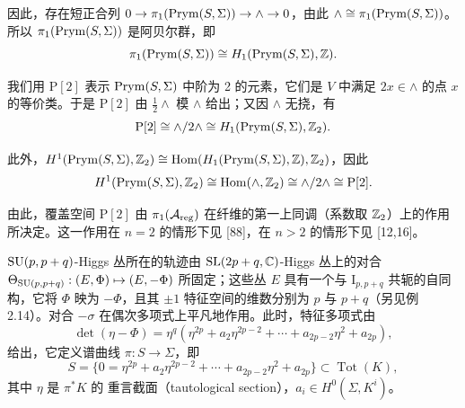 

因此，存在短正合列 $0\to\pi_1(\operatorname{Prym}(S,\Sigma))\to\wedge\to 0$，由此 $\wedge\cong\pi_1(\operatorname{Prym}(S,\Sigma))$。所以 $\pi_1(\operatorname{Prym}(S,\Sigma))$ 是阿贝尔群，即
\[
\pi_1(\operatorname{Prym}(S,\Sigma))\cong H_1(\operatorname{Prym}(S,\Sigma),\mathbb{Z}).
\]

我们用 $\mathrm{P}[2]$ 表示 $\operatorname{Prym}(S,\Sigma)$ 中阶为 2 的元素，它们是 $V$ 中满足 $2x\in\wedge$ 的点 $x$ 的等价类。于是 $\mathrm{P}[2]$ 由 $\frac{1}{2}\wedge$ 模 $\wedge$ 给出；又因 $\wedge$ 无挠，有
\[
\mathrm{P}[2]\cong\wedge/2\wedge\cong H_1(\operatorname{Prym}(S,\Sigma),\mathbb{Z}_2).
\]

此外，$H^1(\operatorname{Prym}(S,\Sigma),\mathbb{Z}_2)\cong\operatorname{Hom}(H_1(\operatorname{Prym}(S,\Sigma),\mathbb{Z}),\mathbb{Z}_2)$，因此
\[
H^1(\operatorname{Prym}(S,\Sigma),\mathbb{Z}_2)\cong\operatorname{Hom}(\wedge,\mathbb{Z}_2)\cong\wedge/2\wedge\cong\mathrm{P}[2].
\]

由此，覆盖空间 $\mathrm{P}[2]$ 由 $\pi_1(\mathcal{A}_{\mathrm{reg}})$ 在纤维的第一上同调（系数取 $\mathbb{Z}_2$）上的作用所决定。这一作用在 $n=2$ 的情形下见 [88]，在 $n>2$ 的情形下见 [12,16]。


 $\mathrm{SU}(p,p+q)$-Higgs 丛所在的轨迹由 $\mathrm{SL}(2p+q,\mathbb{C})$-Higgs 丛上的对合 $\Theta_{\mathrm{SU}(p,p+q)}:(E,\Phi)\mapsto(E,-\Phi)$ 所固定；这些丛 $E$ 具有一个与 $\mathrm{I}_{p,p+q}$ 共轭的自同构，它将 $\Phi$ 映为 $-\Phi$，且其 $\pm1$ 特征空间的维数分别为 $p$ 与 $p+q$（另见例 2.14）。对合 $-\sigma$ 在偶次多项式上平凡地作用。此时，特征多项式由
\begin{equation}
\det(\eta-\Phi)=\eta^q(\eta^{2p}+a_2\eta^{2p-2}+\cdots+a_{2p-2}\eta^2+a_{2p}), \tag{3.8}
\end{equation}
给出，它定义谱曲线 $\pi:S\to\Sigma$，即
\[
S=\{0=\eta^{2p}+a_2\eta^{2p-2}+\cdots+a_{2p-2}\eta^2+a_{2p}\}\subset\operatorname{Tot}(K),
\]
其中 $\eta$ 是 $\pi^*K$ 的 重言截面（tautological section），$a_i\in H^0(\Sigma,K^i)$。

